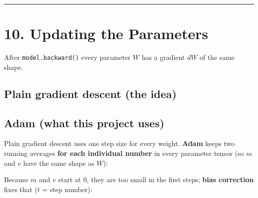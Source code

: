 \documentclass[11pt,a4paper,oneside]{report}
\begin{document}
\begin{center}\rule{0.5\linewidth}{0.5pt}\end{center}

\section{10. Updating the Parameters}\label{10-updating-the-parameters}

After \texttt{model.\allowbreak{}backward()} every parameter \(W\) has a gradient \(dW\) of the same shape.

\subsection{Plain gradient descent (the idea)}\label{plain-gradient-descent-the-idea}

\begin{center}\end{center}

\subsection{Adam (what this project uses)}\label{adam-what-this-project-uses}

Plain gradient descent uses one step size for every weight. \textbf{Adam} keeps two running averages \textbf{for each individual number} in every parameter tensor (so \(m\) and \(v\) have the same shape as \(W\)):

\begin{center}\end{center}
\begin{center}\end{center}

Because \(m\) and \(v\) start at \(0\), they are too small in the first steps; \textbf{bias correction} fixes that (\(t\) = step number):

\begin{center}\end{center}
\end{document}
